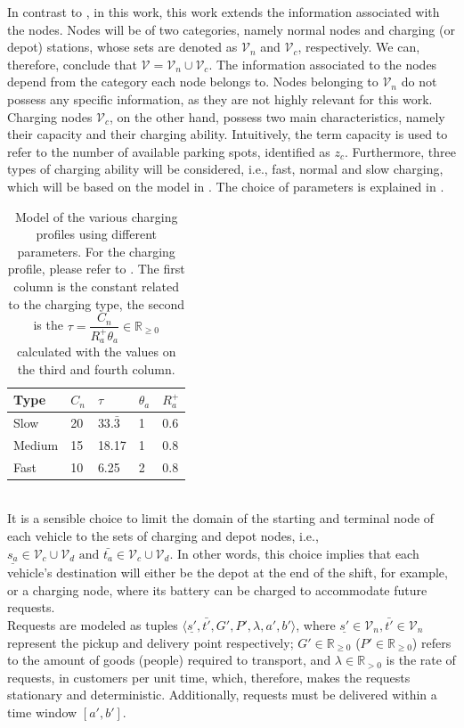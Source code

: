 In contrast to \cite{project_thesis}, in this work, this work extends the information associated with the nodes. Nodes will be of two categories, namely normal nodes and charging (or depot) stations, whose sets are denoted as $\mathcal{V}_n$ and $\mathcal{V}_c$, respectively. We can, therefore, conclude that $\mathcal{V} = \mathcal{V}_n \cup \mathcal{V}_c$. The information associated to the nodes depend from the category each node belongs to. Nodes belonging to $\mathcal{V}_n$ do not possess any specific information, as they are not highly relevant for this work. Charging nodes $\mathcal{V}_c$, on the other hand, possess two main characteristics, namely their capacity and their charging ability. Intuitively, the term capacity is used to refer to the number of available parking spots, identified as $z_c$. Furthermore, three types of charging ability will be considered, i.e., fast, normal and slow charging, which will be based on the model in . The choice of parameters is explained in . 
\begin{table}[th]
	\centering
\begin{tabular}{ |p{2cm}|p{1cm}|p{1cm}|p{1cm}|p{1cm}|}
	\hline
	Type&$C_n$  &$\tau$&$\theta_a$&$R^+_a$ \\
	\hline
	Slow & 20 &$33.\bar{3}$&1&0.6  \\
	Medium &15 &18.17& 1   & 0.8\\
	Fast & 10 & 6.25&2& 0.8\\
	\hline
\end{tabular}
	\caption[Model of the various charging profiles using different parameters]{Model of the various charging profiles using different parameters. For the charging profile, please refer to . The first column is the constant related to the charging type, the second is the $\tau= \dfrac{C_n}{R^+_a\theta_a}\in \mathbb{R}_{\ge0}$ calculated with the values on the third and fourth column. }
	\label{tab:charging_stations}	
\end{table}\\

It is a sensible choice to limit the domain of the starting and terminal node of each vehicle to the sets of charging and depot nodes, i.e., $\underline{s_a}\in\mathcal{V}_c \cup \mathcal{V}_d \text{ and } \bar{t_a}\in \mathcal{V}_c \cup \mathcal{V}_d$. In other words, this choice implies that each vehicle's destination will either be the depot at the end of the shift, for example, or a charging node, where its battery can be charged to accommodate future requests. \\
Requests are modeled as tuples $\langle \underline{s'},\bar{t'}, G', P',\lambda, a', b'\rangle$, where $\underline{s'} \in \mathcal{V}_n,\bar{t'} \in \mathcal{V}_n$ represent the pickup and delivery point respectively; $G'\in \mathbb{R}_{\ge0}$ ($P'\in \mathbb{R}_{\ge0}$) refers to the amount of goods (people) required to transport, and $\lambda \in \mathbb{R}_{>0}$ is the rate of requests, in customers per unit time, which, therefore, makes the requests stationary and deterministic. Additionally, requests must be delivered within a time window $[a',b']$. \\



